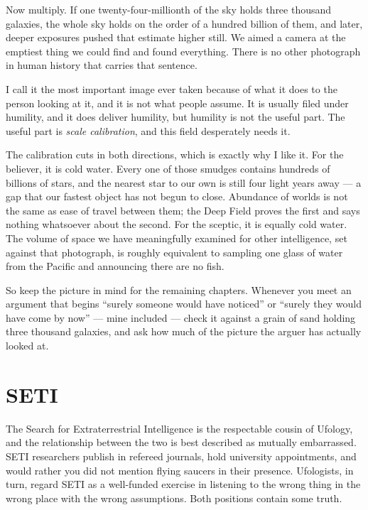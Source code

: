 Now multiply. If one twenty-four-millionth of the sky holds three thousand galaxies, the
whole sky holds on the order of a hundred billion of them, and later, deeper exposures
pushed that estimate higher still. We aimed a camera at the emptiest thing we could find
and found everything. There is no other photograph in human history that carries that
sentence.

I call it the most important image ever taken because of what it does to the person
looking at it, and it is not what people assume. It is usually filed under humility, and
it does deliver humility, but humility is not the useful part. The useful part is
\emph{scale calibration}, and this field desperately needs it.

The calibration cuts in both directions, which is exactly why I like it. For the
believer, it is cold water. Every one of those smudges contains hundreds of billions of
stars, and the nearest star to our own is still four light years away --- a gap that our
fastest object has not begun to close. Abundance of worlds is not the same as ease of
travel between them; the Deep Field proves the first and says nothing whatsoever about
the second. For the sceptic, it is equally cold water. The volume of space we have
meaningfully examined for other intelligence, set against that photograph, is roughly
equivalent to sampling one glass of water from the Pacific and announcing there are no
fish.

So keep the picture in mind for the remaining chapters. Whenever you meet an argument
that begins ``surely someone would have noticed'' or ``surely they would have come by
now'' --- mine included --- check it against a grain of sand holding three thousand
galaxies, and ask how much of the picture the arguer has actually looked at.

\section{SETI}\label{sec:seti}

The Search for Extraterrestrial Intelligence is the respectable cousin of Ufology, and
the relationship between the two is best described as mutually embarrassed. SETI
researchers publish in refereed journals, hold university appointments, and would
rather you did not mention flying saucers in their presence. Ufologists, in turn, regard
SETI as a well-funded exercise in listening to the wrong thing in the wrong place with
the wrong assumptions. Both positions contain some truth.

